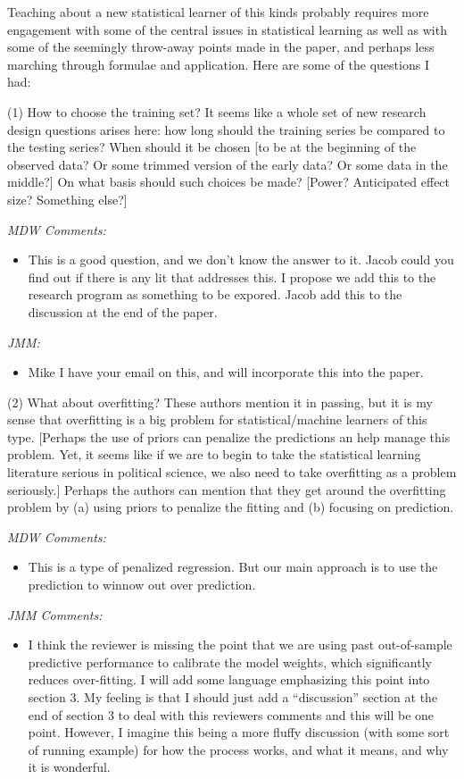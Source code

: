 \documentclass[10pt]{article}
\begin{document}
Teaching about a new statistical learner of this kinds probably
requires more engagement with some of the central issues in
statistical learning as well as with some of the seemingly throw-away
points made in the paper, and perhaps less marching through formulae
and application. Here are some of the questions I had:

(1) How to choose the training set? It seems like a whole set of new
research design questions arises here: how long should the training
series be compared to the testing series? When should it be chosen [to
be at the beginning of the observed data? Or some trimmed version of
the early data? Or some data in the middle?] On what basis should such
choices be made? [Power? Anticipated effect size? Something else?]

{\it  MDW Comments:
\begin{itemize}
\item This is a good question, and we don't know the answer to it. Jacob could you find out if there is any lit that addresses this. I propose we add this to the research program as something to be expored.  Jacob add this to the discussion at the end of the paper.
\end{itemize}
}

{\it JMM:
\begin{itemize}
\item  Mike I have your email on this, and will incorporate this into the paper.
\end{itemize}
}

(2) What about overfitting? These authors mention it in
passing, but it is my sense that overfitting is a big problem for
statistical/machine learners of this type. [Perhaps the use of priors
can penalize the predictions an help manage this problem. Yet, it
seems like if we are to begin to take the statistical learning
literature serious in political science, we also need to take
overfitting as a problem seriously.] Perhaps the authors can mention
that they get around the overfitting problem by (a) using priors to
penalize the fitting and (b) focusing on prediction. 

{\it  MDW Comments:
\begin{itemize}
\item This is a type of penalized regression. But our main approach is to use the prediction to winnow out over prediction.
\end{itemize}
}

{\it JMM Comments:
\begin{itemize}
\item I think the reviewer is missing the point that we are using past out-of-sample predictive performance to calibrate the model weights, which significantly reduces over-fitting.  I will add some language emphasizing this point into section 3.  My feeling is that I should just add a ``discussion'' section at the end of section 3 to deal with this reviewers comments and this will be one point.  However, I imagine this being a more fluffy discussion (with some sort of running example) for how the process works, and what it means, and why it is wonderful.
\end{itemize}
}
\end{document}
